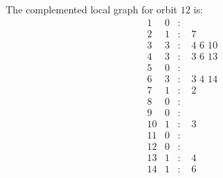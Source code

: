 \documentclass[12pt]{article}
\begin{document}
The complemented local graph for orbit $12$ is:
\begin{equation*}
\begin{array}{rrcl}
1&0&:&\\
2&1&:&\,\,7\\
3&3&:&\,\,4\,\,6\,\,10\\
4&3&:&\,\,3\,\,6\,\,13\\
5&0&:&\\
6&3&:&\,\,3\,\,4\,\,14\\
7&1&:&\,\,2\\
8&0&:&\\
9&0&:&\\
10&1&:&\,\,3\\
11&0&:&\\
12&0&:&\\
13&1&:&\,\,4\\
14&1&:&\,\,6\\
\end{array}
\end{equation*}
\end{document}
